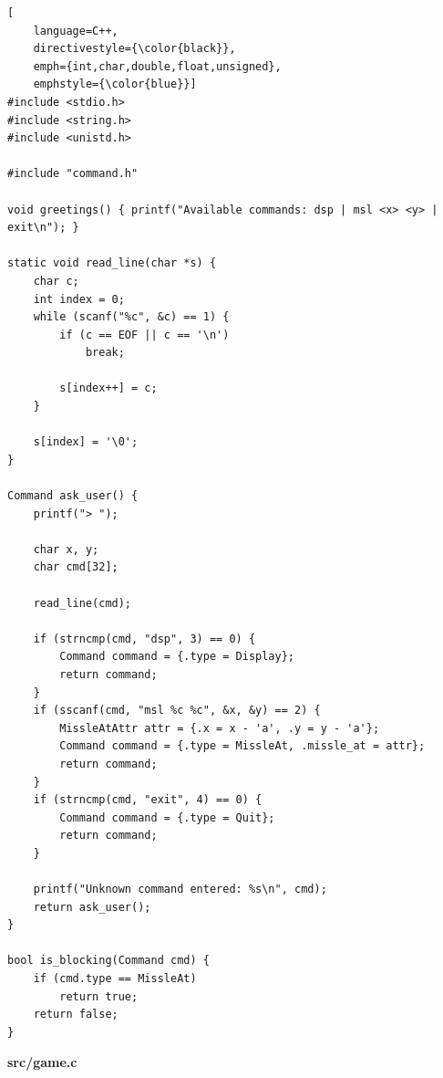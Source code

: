 \begin{lstlisting}[
    language=C++,
    directivestyle={\color{black}}, 
    emph={int,char,double,float,unsigned}, 
    emphstyle={\color{blue}}]
#include <stdio.h>
#include <string.h>
#include <unistd.h>

#include "command.h"

void greetings() { printf("Available commands: dsp | msl <x> <y> | exit\n"); }

static void read_line(char *s) {
    char c;
    int index = 0;
    while (scanf("%c", &c) == 1) {
        if (c == EOF || c == '\n')
            break;

        s[index++] = c;
    }

    s[index] = '\0';
}

Command ask_user() {
    printf("> ");

    char x, y;
    char cmd[32];

    read_line(cmd);

    if (strncmp(cmd, "dsp", 3) == 0) {
        Command command = {.type = Display};
        return command;
    }
    if (sscanf(cmd, "msl %c %c", &x, &y) == 2) {
        MissleAtAttr attr = {.x = x - 'a', .y = y - 'a'};
        Command command = {.type = MissleAt, .missle_at = attr};
        return command;
    }
    if (strncmp(cmd, "exit", 4) == 0) {
        Command command = {.type = Quit};
        return command;
    }

    printf("Unknown command entered: %s\n", cmd);
    return ask_user();
}

bool is_blocking(Command cmd) {
    if (cmd.type == MissleAt)
        return true;
    return false;
}
\end{lstlisting}

\textbf{src/game.c}


